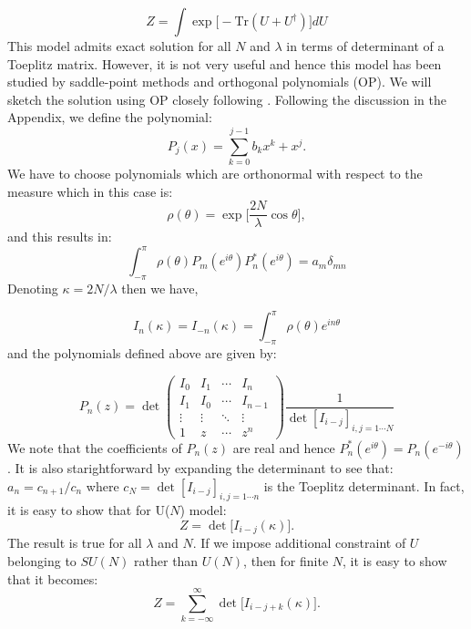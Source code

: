 \documentclass[11pt]{article}
\begin{document}
\begin{equation}
	Z = \int \exp \Big[- \mbox{Tr} (U + U^{\dagger})   \Big] dU
\end{equation}
This model admits exact solution for all $N$ and $\lambda$ in terms of determinant of a Toeplitz matrix. However, it is not very useful and hence this model has been studied by saddle-point methods and orthogonal polynomials (OP). We will sketch the solution using OP 
closely following \cite{Goldschmidt:1979hq}. 
Following the discussion in the Appendix, we define the polynomial:
\begin{equation}
	P_{j}(x) = \sum_{k=0}^{j-1} b_{k} x^{k} + x^{j}. 
\end{equation} 
We have to choose polynomials which are orthonormal with respect to the measure which in this case is:
\begin{equation}
	\rho(\theta) = \exp\Big[\frac{2N}{\lambda} \cos \theta \Big],
\end{equation}
and this results in:
\begin{equation}
	\int_{-\pi}^{\pi} \rho(\theta) P_{m}(e^{i\theta}) P_{n}^{*}(e^{i\theta}) = a_{m} \delta_{mn}
\end{equation}
Denoting $\kappa = 2N/\lambda$ then we have, 

\begin{equation}
	I_{n}(\kappa) = I_{-n}(\kappa) = \int_{-\pi}^{\pi} \rho(\theta) e^{i n \theta} 
\end{equation}
and the polynomials defined above are given by:

\begin{equation}
	P_{n}(z) = \det
	\begin{pmatrix}
		I_0 & I_1 & \cdots & I_n \\
		I_1 & I_0 & \cdots & I_{n-1} \\
		\vdots  & \vdots  & \ddots & \vdots  \\
		1 & z & \cdots & z^n 
			\end{pmatrix}
		 \frac{1}{\det [I_{i-j}]_{i,j = 1 \cdots N}}
\end{equation}
We note that the coefficients of $P_{n}(z)$ are real and hence $P_{n}^{*}(e^{i\theta}) = P_{n}(e^{-i\theta})$. It is also starightforward by expanding the determinant to see that: $a_{n} = c_{n+1}/c_{n}$ where $c_{N} = \det [I_{i-j}]_{i,j = 1 \cdots n}$ is the Toeplitz determinant. In fact, it is easy to show that for U($N$) model:
\begin{equation}
\label{eq:GWW_ex} 
Z = \det \Big[I_{i-j}(\kappa) \Big].
\end{equation}
The result is true for all $\lambda$ and $N$. If we impose additional constraint of 
$U$ belonging to $SU(N)$ rather than $U(N)$, then for finite $N$, it is easy to show that
it becomes:
\begin{equation}
\label{eq:GWW_ex} 
Z = \sum_{k=-\infty}^{\infty} \det \Big[I_{i-j+k}(\kappa) \Big].
\end{equation}
\end{document}

